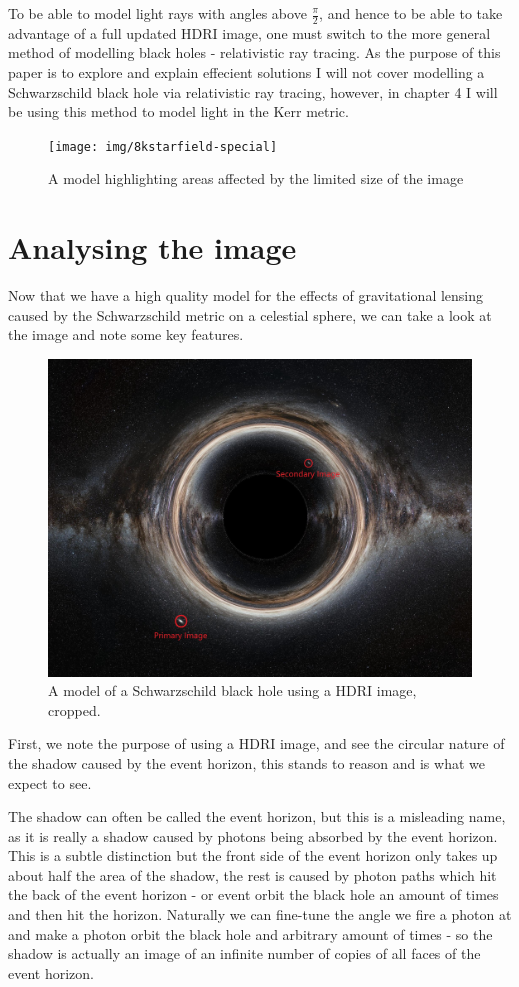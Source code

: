 \documentclass[oneside,openright,frontopenright, singlespacing]{dmathesis}
\begin{document}
\vspace{1em}
	To be able to model light rays with angles above $\frac{\pi}{2}$, and hence to be able to take advantage of a full updated HDRI image, one must switch to the more general method of modelling black holes - relativistic ray tracing. As the purpose of this paper is to explore and explain effecient solutions I will not cover modelling a Schwarzschild black hole via relativistic ray tracing, however, in chapter 4 I will be using this method to model light in the Kerr metric.

\begin{figure}[!ht]
	\centering
	\texttt{[image: img/8kstarfield-special]}
	\caption{A model highlighting areas affected by the limited size of the image}
\end{figure}
\section{Analysing the image}

	Now that we have a high quality model for the effects of gravitational lensing caused by the Schwarzschild metric on a celestial sphere, we can take a look at the image and note some key features.

\begin{figure}[!ht]
	\centering
	\includegraphics[width=0.8\linewidth]{img/milkyway-SC}
	\caption{A model of a Schwarzschild black hole using a HDRI image, cropped.}
\end{figure}

	First, we note the purpose of using a HDRI image, and see the circular nature of the shadow caused by the event horizon, this stands to reason and is what we expect to see. 

\vspace{1em}
	The shadow can often be called the event horizon, but this is a misleading name, as it is really a shadow caused by photons being absorbed by the event horizon. This is a subtle distinction but the front side of the event horizon only takes up about half the area of the shadow, the rest is caused by photon paths which hit the back of the event horizon - or event orbit the black hole an amount of times and then hit the horizon. Naturally we can fine-tune the angle we fire a photon at and make a photon orbit the black hole and arbitrary amount of times - so the shadow is actually an image of an infinite number of copies of all faces of the event horizon.
\end{document}

